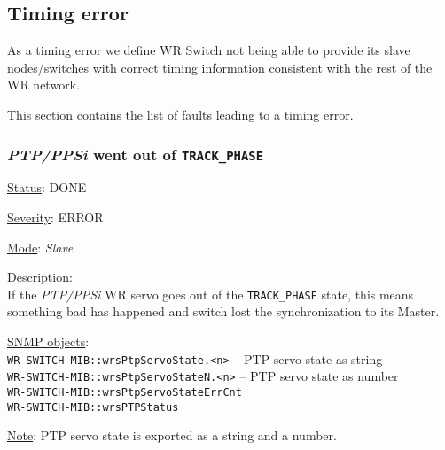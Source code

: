 \subsection{Timing error}
As a timing error we define WR Switch not being able to provide its slave
nodes/switches with correct timing information consistent with the rest of the
WR network.

\noindent This section contains the list of faults leading to a timing error.

\subsubsection{\bf \emph{PTP/PPSi} went out of \texttt{TRACK\_PHASE}}
		\label{fail:timing:ppsi_track_phase}
		\begin{packed_enum}
			\item [] \underline{Status}: DONE
			\item [] \underline{Severity}: ERROR
			\item [] \underline{Mode}: \emph{Slave}
			\item [] \underline{Description}:\\
				If the \emph{PTP/PPSi} WR servo goes out of the \texttt{TRACK\_PHASE}
				state, this means something bad has happened and switch lost the
				synchronization to its Master.
			\item [] \underline{SNMP objects}:\\
				\texttt{WR-SWITCH-MIB::wrsPtpServoState.<n>} -- PTP servo state as string\\
				\texttt{WR-SWITCH-MIB::wrsPtpServoStateN.<n>} -- PTP servo state as number\\
				\texttt{WR-SWITCH-MIB::wrsPtpServoStateErrCnt}\\
				\texttt{WR-SWITCH-MIB::wrsPTPStatus}
			\item [] \underline{Note}: PTP servo state is exported as a string and a number.
		\end{packed_enum}


